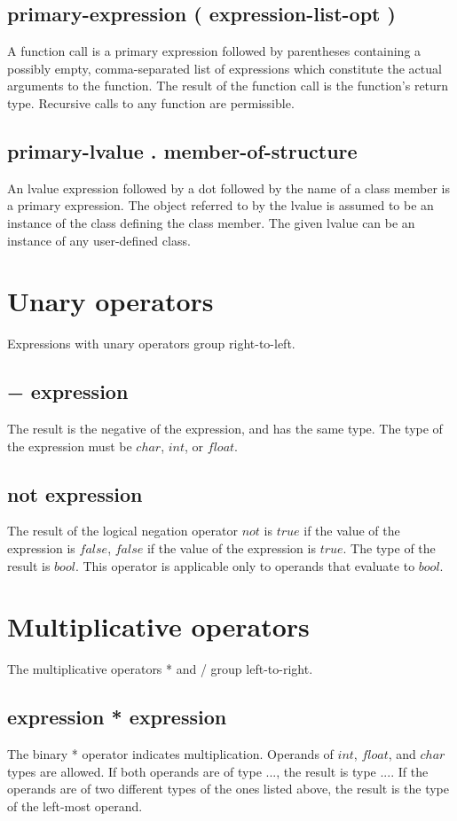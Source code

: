 \begin{homeworkProblem}
    \subsection{primary-expression ( expression-list-opt )}
    A function call is a primary expression followed by parentheses containing a possibly empty, comma-separated
    list of expressions which constitute the actual arguments to the function. The result of the function call is the function's return type. Recursive calls to any function are permissible.

    \subsection{primary-lvalue . member-of-structure}
	An lvalue expression followed by a dot followed by the name of a class member is a primary expression. The object referred to by the lvalue is assumed to be an instance of the class defining the class member. The given lvalue can be an instance of any user-defined class.

    \section{Unary operators}
    Expressions with unary operators group right-to-left.

    \subsection{− expression}
    The result is the negative of the expression, and has the same type. The type of the expression must be $char$, $int$, or $float$.

    \subsection{not expression}
    The result of the logical negation operator $not$ is $true$ if the value of the expression is $false$, $false$ if the value of the expression is $true$. The type of the result is $bool$. This operator is applicable only to operands that evaluate to $bool$.

    \section{Multiplicative operators}
    The multiplicative operators * and / group left-to-right.

    \subsection{expression * expression}
    The binary * operator indicates multiplication. Operands of $int$, $float$, and $char$ types are allowed. If both operands are of type ..., the result is type .... If the operands are of two different types of the ones listed above, the result is the type of the left-most operand.


\end{homeworkProblem}
